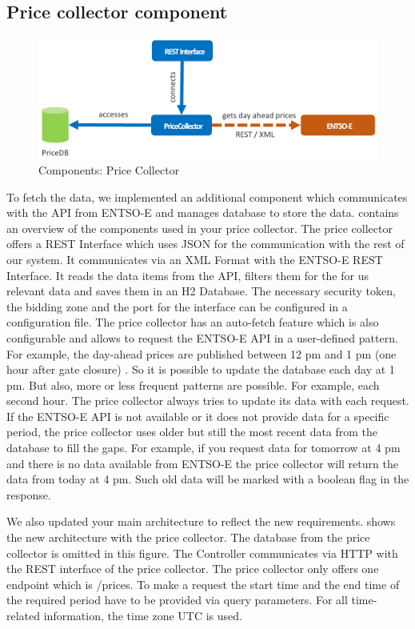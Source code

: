 \subsection{Price collector component}
\begin{figure}[!h]
	\centering
	\includegraphics[width=1.00\textwidth]{../figures/priceCollector.pdf}
	\caption{Components: Price Collector}
	\label{fig:price}
\end{figure}

To fetch the data, we implemented an additional component which communicates with the API from ENTSO-E and manages database to store the data.
 contains an overview of the components used in your price collector.
The price collector offers a REST Interface which uses JSON for the communication with the rest of our system.
It communicates via an XML Format with the ENTSO-E REST Interface.
It reads the data items from the API, filters them for the for us relevant data and saves them in an H2 Database.
The necessary security token, the bidding zone and the port for the interface can be configured in a configuration file. 
The price collector has an auto-fetch feature which is also configurable and allows to request the ENTSO-E API in a user-defined pattern.
For example, the day-ahead prices are published between 12 pm and 1 pm (one hour after gate closure) \cite{ENTSO3}.
So it is possible to update the database each day at 1 pm. But also, more or less frequent patterns are possible.
For example, each second hour. 
The price collector always tries to update its data with each request. 
If the ENTSO-E API is not available or it does not provide data for a specific period, the price collector uses older but still the most recent data from the database to fill the gaps. 
For example, if you request data for tomorrow at 4 pm and there is no data available from ENTSO-E the price collector will return the data from today at 4 pm. 
Such old data will be marked with a boolean flag in the response.    

We also updated your main architecture to reflect the new requirements.
 shows the new architecture with the price collector.
The database from the price collector is omitted in this figure.
The Controller communicates via HTTP with the REST interface of the price collector.
The price collector only offers one endpoint which is \glqq/prices\grqq{}. 
To make a request the start time and the end time of the required period have to be provided via query parameters. 
For all time-related information, the time zone UTC is used. 

